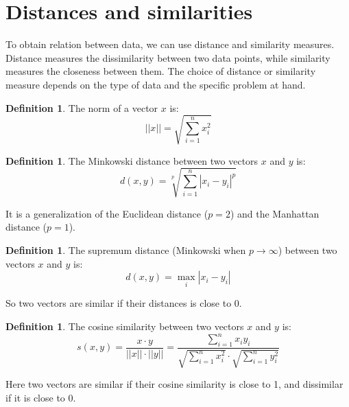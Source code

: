 \documentclass[12pt, openany]{report}
\theoremstyle{definition}
\newtheorem{definition}[thm]{Definition}
\begin{document}
\section{Distances and similarities}
To obtain relation between data, we can use distance and similarity measures. Distance measures the dissimilarity between two data points, while similarity measures the closeness between them. The choice of distance or similarity measure depends on the type of data and the specific problem at hand.
\begin{definition}
    The norm of a vector $x$ is:
    \begin{equation}
        ||x|| = \sqrt{\sum_{i=1}^{n} x_i^2}
    \end{equation}
\end{definition}
\begin{definition}
    The Minkowski distance between two vectors $x$ and $y$ is:
    \begin{equation}
        d(x,y) = \sqrt[p]{\sum_{i=1}^{n} |x_i - y_i|^p}
    \end{equation}
\end{definition}
It is a generalization of the Euclidean distance ($p=2$) and the Manhattan distance ($p=1$).
\begin{definition}
    The supremum distance (Minkowski when $p \rightarrow \infty$) between two vectors $x$ and $y$ is:
    \begin{equation}
        d(x,y) = \max_{i} |x_i - y_i|
    \end{equation}
\end{definition}
So two vectors are similar if their distances is close to 0.
\begin{definition}
    The cosine similarity between two vectors $x$ and $y$ is:
    \begin{equation}
        s(x,y) = \frac{x \cdot y}{||x|| \cdot ||y||} = \frac{\sum_{i=1}^{n} x_i y_i}{\sqrt{\sum_{i=1}^{n} x_i^2} \cdot \sqrt{\sum_{i=1}^{n} y_i^2}}
    \end{equation}
\end{definition}
Here two vectors are similar if their cosine similarity is close to 1, and dissimilar if it is close to 0.
\end{document}
